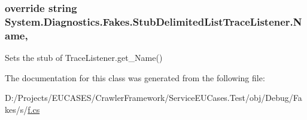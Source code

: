 \hypertarget{class_system_1_1_diagnostics_1_1_fakes_1_1_stub_delimited_list_trace_listener_aa2ce31d8eb58b8dada6272e3fe936b0d}{
\subsubsection[{Name}]{\setlength{\rightskip}{0pt plus 5cm}override string System.\-Diagnostics.\-Fakes.\-Stub\-Delimited\-List\-Trace\-Listener.\-Name\hspace{0.3cm}{\ttfamily [get]}, {\ttfamily [set]}}}\label{class_system_1_1_diagnostics_1_1_fakes_1_1_stub_delimited_list_trace_listener_aa2ce31d8eb58b8dada6272e3fe936b0d}


Sets the stub of Trace\-Listener.\-get\-\_\-\-Name()



The documentation for this class was generated from the following file\-:\begin{DoxyCompactItemize}
\item 
D\-:/\-Projects/\-E\-U\-C\-A\-S\-E\-S/\-Crawler\-Framework/\-Service\-E\-U\-Cases.\-Test/obj/\-Debug/\-Fakes/s/\hyperlink{s_2f_8cs}{f.\-cs}\end{DoxyCompactItemize}
